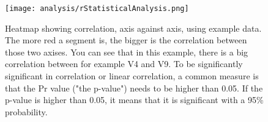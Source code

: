 




\begin{figure}[h]
    \centering
    \texttt{[image: analysis/rStatisticalAnalysis.png]}
    \caption{Heatmap showing correlation, axis against axis, using example data. The more red a segment is, the bigger is the correlation between those two axises. You can see that in this example, there is a big correlation between for example V4 and V9. To be significantly significant in correlation or linear correlation, a common measure is that the Pr value ("the p-value") needs to be higher than 0.05. If the p-value is higher than 0.05, it means that it is significant with a 95\% probability.}
    \label{fig:corrHeatmap}
\end{figure}



